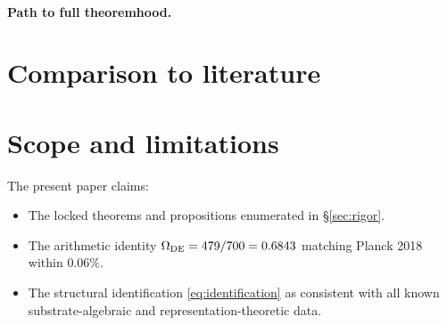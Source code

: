 \documentclass[11pt,reqno]{amsart}
\theoremstyle{plain}
\theoremstyle{definition}
\theoremstyle{remark}
\newcommand{\OmegaDE}{\Omega_{\rm DE}}
\begin{document}
\paragraph{Path to full theoremhood.}

\section{Comparison to literature}\label{sec:literature}


\section{Scope and limitations}\label{sec:scope}


The present paper claims:
\begin{itemize}
\item The locked theorems and propositions enumerated in \S\ref{sec:rigor}.
\item The arithmetic identity $\OmegaDE = 479/700 = 0.6843$ matching
      Planck 2018 within $0.06\%$.
\item The structural identification \eqref{eq:identification} as
      consistent with all known substrate-algebraic and
      representation-theoretic data.
\end{itemize}
\end{document}
